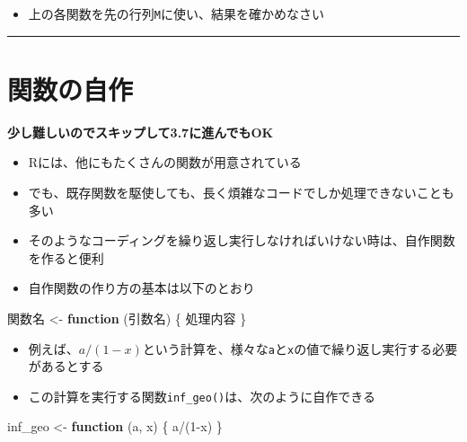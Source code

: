 \documentclass[
]{book}
\newenvironment{Shaded}{\begin{snugshade}}{\end{snugshade}}
\newcommand{\ControlFlowTok}[1]{\textcolor[rgb]{0.13,0.29,0.53}{\textbf{#1}}}
\newcommand{\DecValTok}[1]{\textcolor[rgb]{0.00,0.00,0.81}{#1}}
\newcommand{\NormalTok}[1]{#1}
\newcommand{\OtherTok}[1]{\textcolor[rgb]{0.56,0.35,0.01}{#1}}
\newcommand{\SpecialCharTok}[1]{\textcolor[rgb]{0.00,0.00,0.00}{#1}}
\providecommand{\tightlist}{%
  \setlength{\itemsep}{0pt}\setlength{\parskip}{0pt}}
\begin{document}
\begin{itemize}
\tightlist
\item
  上の各関数を先の行列\texttt{M}に使い、結果を確かめなさい
\end{itemize}

\begin{center}\rule{0.5\linewidth}{0.5pt}\end{center}

\hypertarget{ux95a2ux6570ux306eux81eaux4f5c}{%
\section{関数の自作}\label{ux95a2ux6570ux306eux81eaux4f5c}}

\textbf{少し難しいのでスキップして3.7に進んでもOK }

\begin{itemize}
\tightlist
\item
  Rには、他にもたくさんの関数が用意されている
\item
  でも、既存関数を駆使しても、長く煩雑なコードでしか処理できないことも多い
\item
  そのようなコーディングを繰り返し実行しなければいけない時は、自作関数を作ると便利
\item
  自作関数の作り方の基本は以下のとおり
\end{itemize}

\begin{Shaded}
\begin{Highlighting}[]
\NormalTok{関数名 }\OtherTok{\textless{}{-}} \ControlFlowTok{function}\NormalTok{ (引数名) \{}
\NormalTok{  処理内容}
\NormalTok{\}}
\end{Highlighting}
\end{Shaded}

\begin{itemize}
\tightlist
\item
  例えば、\(a/(1-x)\)という計算を、様々な\texttt{a}と\texttt{x}の値で繰り返し実行する必要があるとする
\item
  この計算を実行する関数\texttt{inf\_geo()}は、次のように自作できる
\end{itemize}

\begin{Shaded}
\begin{Highlighting}[]
\NormalTok{inf\_geo }\OtherTok{\textless{}{-}} \ControlFlowTok{function}\NormalTok{ (a, x) \{}
\NormalTok{  a}\SpecialCharTok{/}\NormalTok{(}\DecValTok{1}\SpecialCharTok{{-}}\NormalTok{x)}
\NormalTok{\}}
\end{Highlighting}
\end{Shaded}
\end{document}
